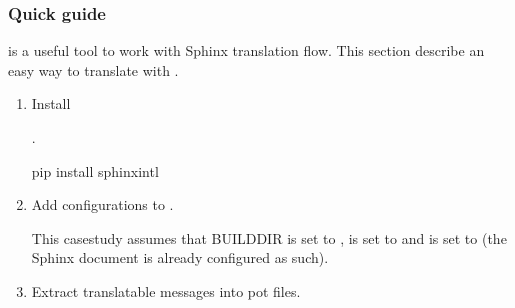 \documentclass[letterpaper,10pt,english]{sphinxmanual}
\begin{document}
\subsubsection{Quick guide}
\label{\detokenize{usage/advanced/intl:quick-guide}}
%
\begin{footnote}[4]\sphinxAtStartFootnote
{}
%
\end{footnote} is a useful tool to work with Sphinx translation flow.  This
section describe an easy way to translate with .
\begin{enumerate}
%
\item {} 
Install %
\begin{footnote}[5]\sphinxAtStartFootnote
{}
%
\end{footnote}.

\begin{sphinxVerbatim}[commandchars=\\\{\}]
 pip install sphinx\PYGZhy{}intl
\end{sphinxVerbatim}

\item {} 
Add configurations to .

\begin{sphinxVerbatim}[commandchars=\\\{\}]
  \PYG{p}{[}\PYG{p}{]}   
       
\end{sphinxVerbatim}

This case\sphinxhyphen{}study assumes that BUILDDIR is set to ,
 is set to  and 
is set to  (the Sphinx document is already configured as such).

\item {} 
Extract translatable messages into pot files.


\end{enumerate}
\end{document}
